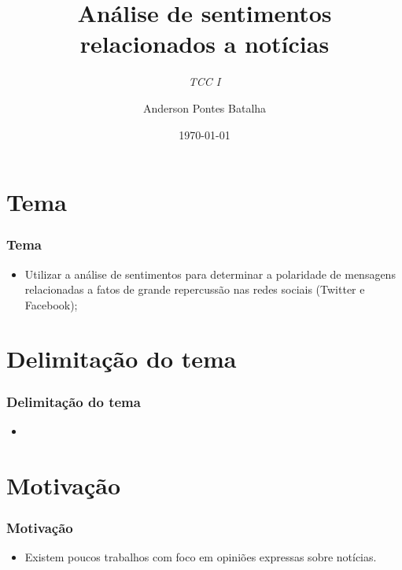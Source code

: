 \documentclass{beamer}
\title[Sistemas de Informação]{\textbf{Análise de sentimentos\\ relacionados a notícias}} %
\subtitle{\textit{TCC I}}
\institute[IFC]{
Instituto Federal Catarinense -- IFC\\
Campus Araquari \\
}
\author{Anderson Pontes Batalha}
\date{\tiny{\today}}
\begin{document}
\begin{frame}
    \maketitle
\end{frame}


\section{Tema}
\begin{frame}%
\frametitle{\textbf{Tema}\transdissolve}%
\begin{itemize}%
\item<1-> Utilizar a análise de sentimentos para determinar a polaridade de mensagens relacionadas a fatos de grande repercussão nas redes sociais (Twitter e Facebook);
\end{itemize}
\end{frame}

\section{Delimitação do tema}
\begin{frame}%
\frametitle{\textbf{Delimitação do tema}\transdissolve}%
\begin{itemize}%
\item<1->
\end{itemize}
\end{frame}

\section{Motivação}
\begin{frame}%
\frametitle{\textbf{Motivação}\transdissolve}%
\begin{itemize}%
\item<1->Existem poucos trabalhos com foco em opiniões expressas sobre notícias.
\end{itemize}

\end{frame}
\end{document}
